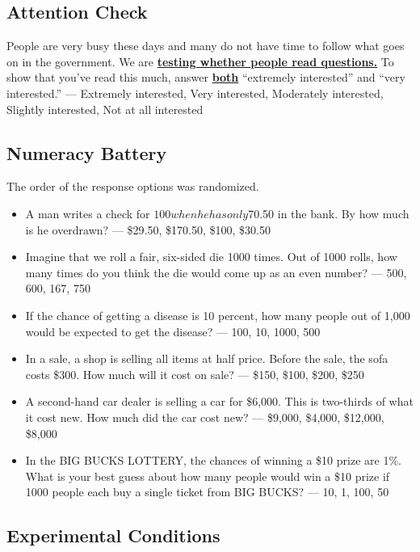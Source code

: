 \documentclass[12pt, letterpaper]{article}
\begin{document}
\subsection{Attention Check}
People are very busy these days and many do not have time to follow what goes on in the government. We are \textbf{\underline{testing whether people read questions.}} To show that you've read this much, answer \textbf{\underline{both}} ``extremely interested'' and ``very interested.'' --- Extremely interested, Very interested, Moderately interested,  Slightly interested, Not at all interested

\subsection{Numeracy Battery}

The order of the response options was randomized.

\begin{itemize}
    \item A man writes a check for $100 when he has only $70.50 in the bank. By how much is he overdrawn? — \$29.50, \$170.50, \$100, \$30.50
    \item Imagine that we roll a fair, six-sided die 1000 times. Out of 1000 rolls, how many times do you think the die would come up as an even number? — 500, 600, 167, 750
    \item If the chance of getting a disease is 10 percent, how many people out of 1,000 would be expected to get the disease? — 100, 10, 1000, 500
    \item In a sale, a shop is selling all items at half price. Before the sale, the sofa costs \$300. How much will it cost on sale? — \$150, \$100, \$200, \$250
    \item A second-hand car dealer is selling a car for \$6,000. This is two-thirds of what it cost new. How much did the car cost new? — \$9,000, \$4,000, \$12,000, \$8,000
    \item In the BIG BUCKS LOTTERY, the chances of winning a \$10 prize are 1\%. What is your best guess about how many people would win a \$10 prize if 1000 people each buy a single ticket from BIG BUCKS? — 10, 1, 100, 50
\end{itemize}

\subsection{Experimental Conditions}
\end{document}
